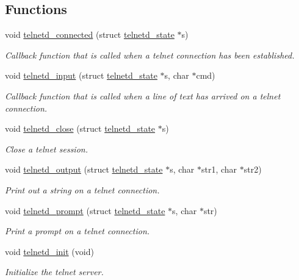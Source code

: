 \subsection*{Functions}
\begin{CompactItemize}
\item 
void \hyperlink{a00081_g992adc34dbe12cd28c2e5cc4c043b461}{telnetd\_\-connected} (struct \hyperlink{a00027}{telnetd\_\-state} $\ast$s)
\begin{CompactList}\small\item\em Callback function that is called when a telnet connection has been established. \item\end{CompactList}\item 
void \hyperlink{a00081_ge639174c3eb987213a3ff0b1e138da26}{telnetd\_\-input} (struct \hyperlink{a00027}{telnetd\_\-state} $\ast$s, char $\ast$cmd)
\begin{CompactList}\small\item\em Callback function that is called when a line of text has arrived on a telnet connection. \item\end{CompactList}\item 
void \hyperlink{a00081_g816bdc3e31e05e0979efe91a697b10ad}{telnetd\_\-close} (struct \hyperlink{a00027}{telnetd\_\-state} $\ast$s)
\begin{CompactList}\small\item\em Close a telnet session. \item\end{CompactList}\item 
void \hyperlink{a00081_g24ecabdebc734cb350bdd766c0cddf1c}{telnetd\_\-output} (struct \hyperlink{a00027}{telnetd\_\-state} $\ast$s, char $\ast$str1, char $\ast$str2)
\begin{CompactList}\small\item\em Print out a string on a telnet connection. \item\end{CompactList}\item 
void \hyperlink{a00081_g8873fd3ee516cfcca82cc4bc67f564c0}{telnetd\_\-prompt} (struct \hyperlink{a00027}{telnetd\_\-state} $\ast$s, char $\ast$str)
\begin{CompactList}\small\item\em Print a prompt on a telnet connection. \item\end{CompactList}\item 
void \hyperlink{a00081_g82ff99d50221f7c17df57dc6092ffc97}{telnetd\_\-init} (void)
\begin{CompactList}\small\item\em Initialize the telnet server. \item\end{CompactList}\end{CompactItemize}


